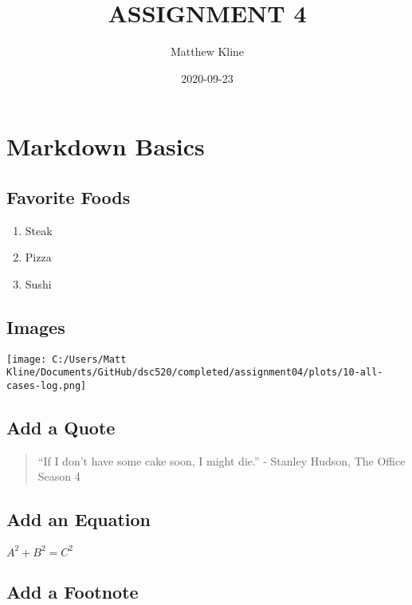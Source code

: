 \documentclass[
]{article}
\title{ASSIGNMENT 4}
\author{Matthew Kline}
\date{2020-09-23}
\providecommand{\tightlist}{%
  \setlength{\itemsep}{0pt}\setlength{\parskip}{0pt}}
\begin{document}
\maketitle

\hypertarget{markdown-basics}{%
\section{Markdown Basics}\label{markdown-basics}}

\hypertarget{favorite-foods}{%
\subsection{Favorite Foods}\label{favorite-foods}}

\begin{enumerate}
\def\labelenumi{\arabic{enumi}.}
\tightlist
\item
  Steak
\item
  Pizza
\item
  Sushi
\end{enumerate}

\hypertarget{images}{%
\subsection{Images}\label{images}}

\texttt{[image: C:/Users/Matt Kline/Documents/GitHub/dsc520/completed/assignment04/plots/10-all-cases-log.png]}

\hypertarget{add-a-quote}{%
\subsection{Add a Quote}\label{add-a-quote}}

\begin{quote}
``If I don't have some cake soon, I might die.'' - Stanley Hudson, The
Office Season 4
\end{quote}

\hypertarget{add-an-equation}{%
\subsection{Add an Equation}\label{add-an-equation}}

\(A^{2} + B^{2} = C^{2}\)

\hypertarget{add-a-footnote}{%
\subsection{Add a Footnote}\label{add-a-footnote}}
\end{document}
